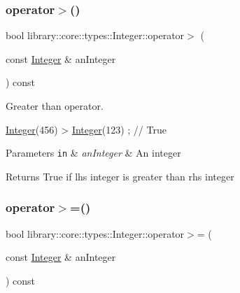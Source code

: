 \subsubsection{\texorpdfstring{operator$>$()}{operator>()}}
{\footnotesize\ttfamily bool library\+::core\+::types\+::\+Integer\+::operator$>$ (\begin{DoxyParamCaption}\item[{const \hyperlink{classlibrary_1_1core_1_1types_1_1_integer}{Integer} \&}]{an\+Integer }\end{DoxyParamCaption}) const}



Greater than operator. 


\begin{DoxyCode}
\hyperlink{classlibrary_1_1core_1_1types_1_1_integer_a6483b1c4e13e5ed6af5e7a58347efead}{Integer}(456) > \hyperlink{classlibrary_1_1core_1_1types_1_1_integer_a6483b1c4e13e5ed6af5e7a58347efead}{Integer}(123) ; \textcolor{comment}{// True}
\end{DoxyCode}



\begin{DoxyParams}[1]{Parameters}
\mbox{\tt in}  & {\em an\+Integer} & An integer \\
\hline
\end{DoxyParams}
\begin{DoxyReturn}{Returns}
True if lhs integer is greater than rhs integer 
\end{DoxyReturn}
\mbox{\label{classlibrary_1_1core_1_1types_1_1_integer_ae565ce34bef391725beebb42269d26fe}} 
\subsubsection{\texorpdfstring{operator$>$=()}{operator>=()}}
{\footnotesize\ttfamily bool library\+::core\+::types\+::\+Integer\+::operator$>$= (\begin{DoxyParamCaption}\item[{const \hyperlink{classlibrary_1_1core_1_1types_1_1_integer}{Integer} \&}]{an\+Integer }\end{DoxyParamCaption}) const}



